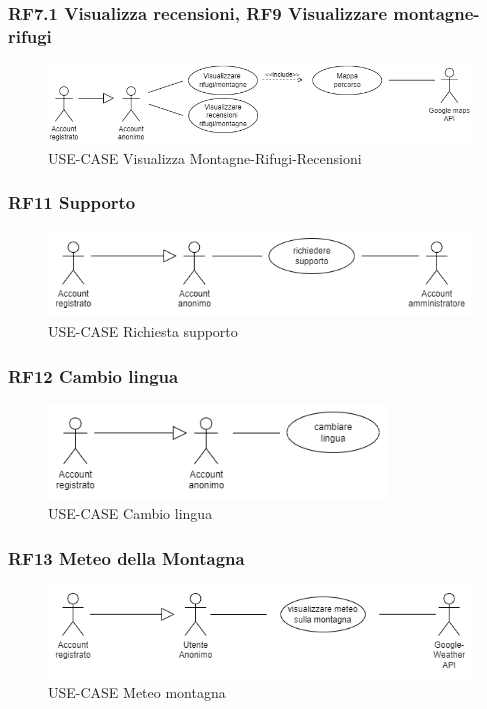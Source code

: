 \documentclass[a4paper,12pt]{article}
\begin{document}
\subsubsection*{RF7.1 Visualizza recensioni, RF9 Visualizzare montagne-rifugi}
\begin{figure}[H]
   \centering
   \includegraphics[width=1.0\textwidth]{img-D2/visualizzare_montagne.png}
    \caption{USE-CASE Visualizza Montagne-Rifugi-Recensioni}
\end{figure}


\subsubsection*{RF11 Supporto}
\begin{figure}[H]
   \centering
   \includegraphics[width=1\textwidth]{img-D2/richiesta_supporto.png}
    \caption{USE-CASE Richiesta supporto}
\end{figure}

\subsubsection*{RF12 Cambio lingua}
\begin{figure}[H]
   \centering
   \includegraphics[width=0.8\textwidth]{img-D2/cambio_lingua.png}
    \caption{USE-CASE Cambio lingua}
\end{figure}

\subsubsection*{RF13 Meteo della Montagna}
\begin{figure}[H]
   \centering
   \includegraphics[width=1\textwidth]{img-D2/meteo.png}
    \caption{USE-CASE Meteo montagna}
\end{figure}
\end{document}
